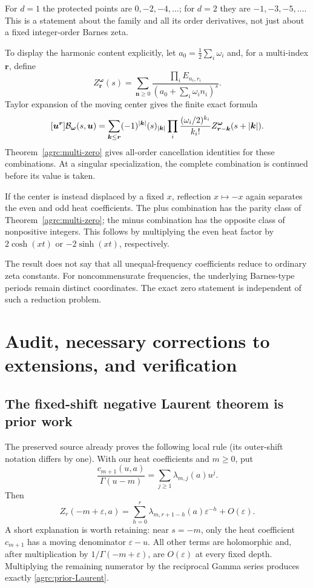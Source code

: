 For $d=1$ the protected points are $0,-2,-4,\ldots$; for $d=2$ they
are $-1,-3,-5,\ldots$. This is a statement about the family and all its
order derivatives, not just about a fixed integer-order Barnes zeta.

To display the harmonic content explicitly, let
$a_0=\frac12\sum_i\omega_i$ and, for a multi-index $\bm r$, define
\[
 Z_{\bm r}^{\bm\omega}(s)=
 \sum_{\bm n\geq0}\frac{\prod_i E_{n_i,r_i}}
                         {(a_0+\sum_i\omega_i n_i)^s}.
\]
Taylor expansion of the moving center gives the finite exact formula
\begin{equation}\label{agrc:multi-coeff}
 [\bm u^{\bm r}]\mathcal B_{\bm\omega}(s,\bm u)
 =\sum_{\bm k\leq\bm r}(-1)^{|\bm k|}(s)_{|\bm k|}
       \prod_i\frac{(\omega_i/2)^{k_i}}{k_i!}
          Z_{\bm r-\bm k}^{\bm\omega}(s+|\bm k|).
\end{equation}
Theorem~\ref{agrc:multi-zero} gives all-order cancellation identities
for these combinations. At a singular specialization, the complete
combination is continued before its value is taken.

If the center is instead displaced by a fixed $x$, reflection
$x\mapsto-x$ again separates the even and odd heat coefficients.
The plus combination has the parity class of Theorem~\ref{agrc:multi-zero};
the minus combination has the opposite class of nonpositive integers.
This follows by multiplying the even heat factor by $2\cosh(xt)$ or
$-2\sinh(xt)$, respectively.

The result does not say that all unequal-frequency coefficients reduce
to ordinary zeta constants. For noncommensurate frequencies, the
underlying Barnes-type periods remain distinct coordinates. The exact
zero statement is independent of such a reduction problem.

\section{Audit, necessary corrections to extensions, and verification}
\label{agrc:audit-section}

\subsection{The fixed-shift negative Laurent theorem is prior work}

The preserved source \cite{repo-laurent} already proves the following
local rule (its outer-shift notation differs by one). With our heat
coefficients and $m\geq0$, put
\[
 \frac{c_{m+1}(u,a)}{\Gamma(u-m)}
       =\sum_{j\geq1}\lambda_{m,j}(a)u^j.
\]
Then
\begin{equation}\label{agrc:prior-Laurent}
 Z_r(-m+\varepsilon,a)
 =\sum_{h=0}^r\lambda_{m,r+1-h}(a)\varepsilon^{-h}
        +O(\varepsilon).
\end{equation}
A short explanation is worth retaining: near $s=-m$, only the heat
coefficient $c_{m+1}$ has a moving denominator $\varepsilon-u$.
All other terms are holomorphic and, after multiplication by
$1/\Gamma(-m+\varepsilon)$, are $O(\varepsilon)$ at every fixed depth.
Multiplying the remaining numerator by the reciprocal Gamma series
produces exactly \eqref{agrc:prior-Laurent}.

